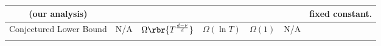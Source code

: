 \begin{table*}[tb]
\begin{tabular}{c|c|c|c|c|c|l}
     \textbf{(our analysis)} & & & & &  & fixed constant. \\ \hline
     Conjectured Lower Bound & \multirow{2}{*}{N/A} & \multirow{2}{*}{$\Omega\rbr{T^{\frac{d - \nu}{d}}}$} & \multirow{2}{*}{$\Omega(\ln T)$} & \multirow{2}{*}{$\Omega(1)$} & \multirow{2}{*}{N/A} & \\
     \cite{vakili2022open} & & & & & & \\
    \end{tabular}
    \label{tab:nl_cr_compare}
\end{table*}